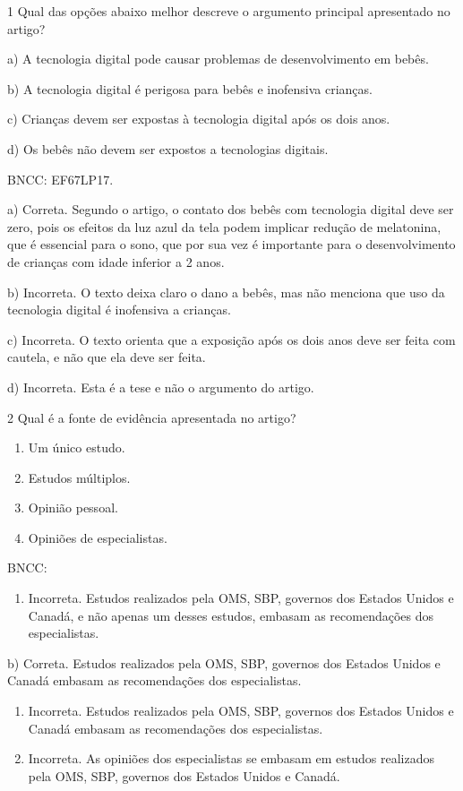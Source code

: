 \num{1} Qual das opções abaixo melhor descreve o argumento principal
apresentado no artigo?

a) A tecnologia digital pode causar problemas de desenvolvimento em
bebês.

b) A tecnologia digital é perigosa para bebês e inofensiva crianças.

c) Crianças devem ser expostas à tecnologia digital após os dois anos.

d) Os bebês não devem ser expostos a tecnologias digitais.

BNCC: EF67LP17.

a) Correta. Segundo o artigo, o contato dos bebês com tecnologia digital
deve ser zero, pois os efeitos da luz azul da tela podem implicar
redução de melatonina, que é essencial para o sono, que por sua vez é
importante para o desenvolvimento de crianças com idade inferior a 2
anos.

b) Incorreta. O texto deixa claro o dano a bebês, mas não menciona que
uso da tecnologia digital é inofensiva a crianças.

c) Incorreta. O texto orienta que a exposição após os dois anos deve ser
feita com cautela, e não que ela deve ser feita.

d) Incorreta. Esta é a tese e não o argumento do artigo.

\num{2} Qual é a fonte de evidência apresentada no artigo?

\begin{enumerate}
\def\labelenumi{\alph{enumi})}
\item
  Um único estudo.
\item
  Estudos múltiplos.
\item
  Opinião pessoal.
\item
  Opiniões de especialistas.
\end{enumerate}

BNCC:

\begin{enumerate}
\def\labelenumi{\alph{enumi})}
\tightlist
\item
  Incorreta. Estudos realizados pela OMS, SBP, governos dos Estados
  Unidos e Canadá, e não apenas um desses estudos, embasam as
  recomendações dos especialistas.
\end{enumerate}

b) Correta. Estudos realizados pela OMS, SBP, governos dos Estados
Unidos e Canadá embasam as recomendações dos especialistas.

\begin{enumerate}
\def\labelenumi{\alph{enumi})}
\setcounter{enumi}{2}
\item
  Incorreta. Estudos realizados pela OMS, SBP, governos dos Estados
  Unidos e Canadá embasam as recomendações dos especialistas.
\item
  Incorreta. As opiniões dos especialistas se embasam em estudos
  realizados pela OMS, SBP, governos dos Estados Unidos e Canadá.
\end{enumerate}

